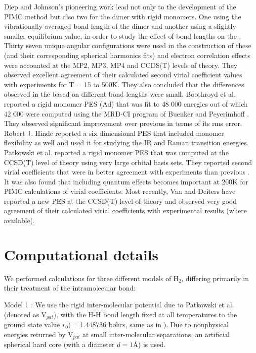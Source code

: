         Diep and Johnson's \cite{Diep2000} pioneering work lead not only to the development of the PIMC method but also two \abinitio{} \PESs{} for the dimer with rigid monomers. One using the vibrationally-averaged bond length of the dimer and another using a slightly smaller equilibrium value, in order to study the effect of bond lengths on the \PESs{}. Thirty seven unique angular configurations were used in the construction of these \PESs{} (and their corresponding spherical harmonics fits) and electron correlation effects were accounted at the MP2, MP3, MP4 and CCDS(T) levels of theory. They observed excellent agreement of their calculated second virial coefficient values with experiments for T = 15 to 500K. They also concluded that the differences observed in the \PESs{} based on different bond lengths were small. Boothroyd et al. \cite{Boothroyd2002} reported a rigid monomer PES (Ad) that was fit to \Sim{} 48 000 \abinitio{} energies out of which \Sim{} 42 000 were computed using the MRD-CI program of Buenker and Peyerimhoff \cite{Buenker1974}. They observed significant improvement over previous \PESs{} in terms of its rms error. Robert J. Hinde \cite{Hinde2008} reported a six dimensional PES that included monomer flexibility as well and used it for studying the IR and Raman transition energies. Patkowski et al. \cite{Patkowski2008} reported a rigid monomer PES that was computed at the CCSD(T) level of theory using very large orbital basis sets. They reported second virial coefficients that were in better agreement with experiments than previous \PESs{}. It was also found that including quantum effects becomes important at \Sim{} 200K for PIMC calculations of virial coefficients. Most recently, Van and Deiters \cite{Tat2015} have reported a new \abinitio{} PES at the CCSD(T) level of theory and observed very good agreement of their calculated virial coefficients with experimental results (where available).

    \section{Computational details}
    \label{sec:Computational details}

        We performed calculations for three different models of H$_2$, differing primarily in their treatment of the intramolecular bond:
       
        Model 1 : We use the rigid inter-molecular potential due to Patkowski et al.\cite{Patkowski2008} (denoted as V$_{pat}$), with the H-H bond length fixed at all temperatures to the ground state value $r_0 ( = $1.448736 bohrs, same as in \cite{Patkowski2008}). Due to nonphysical energies returned by V$_{pat}$ at small inter-molecular separations, an artificial spherical hard core (with a diameter $d = 1${\AA}) is used.

